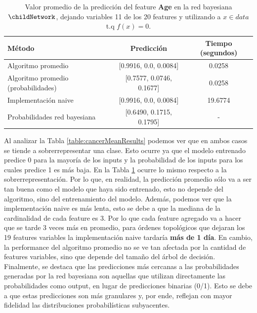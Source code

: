 \begin{table}[ht]
    \centering
    \begin{tabular}{l c c}
        \toprule
        \textbf{M\'etodo} & \textbf{Predicci\'on} & \textbf{Tiempo (segundos)} \\
        \midrule
        Algoritmo promedio & [0.9916, 0.0, 0.0084] & 0.0258 \\
        Algoritmo promedio (probabilidades) & [0.7577, 0.0746, 0.1677] & 0.0258 \\
        Implementaci\'on naive & [0.9916, 0.0, 0.0084] & 19.6774 \\
        Probabilidades red bayesiana & [0.6490, 0.1715, 0.1795] & - \\
        \bottomrule
    \end{tabular}
    \caption{Valor promedio de la predicci\'on del feature \textbf{Age} en la red bayesiana $\childNetwork$, dejando variables 11 de los 20 features y utilizando a $x\in data$ t.q $f(x)=0$.}
    \label{table:childMeanResults}
\end{table}

Al analizar la Tabla \ref{table:cancerMeanResults} podemos ver que en ambos casos se tiende a sobrerrepresentar una clase. Esto ocurre ya que el modelo entrenado predice 0 para la mayoría de los inputs y la probabilidad de los inputs para los cuales predice 1 es más baja. En la Tabla \ref{table:childMeanResults} ocurre lo mismo respecto a la sobrerrepresentación. Por lo que, en realidad, la predicción promedio sólo va a ser tan buena como el modelo que haya sido entrenado, esto no depende del algoritmo, sino del entrenamiento del modelo.
Además, podemos ver que la implementación naive es más lenta, esto se debe a que la mediana de la cardinalidad de cada feature es 3. Por lo que cada feature agregado va a hacer que se tarde 3 veces más en promedio, para órdenes topológicos que dejaran los 19 features variables la implementación naive tardaría \textbf{más de 1 día}. En cambio, la performance del algoritmo promedio no se ve tan afectada por la cantidad de features variables, sino que depende del tamaño del árbol de decisión. Finalmente, se destaca que las predicciones más cercanas a las probabilidades generadas por la red bayesiana son aquellas que utilizan directamente las probabilidades como output, en lugar de predicciones binarias (0/1). Esto se debe a que estas predicciones son más granulares y, por ende, reflejan con mayor fidelidad las distribuciones probabilísticas subyacentes.

